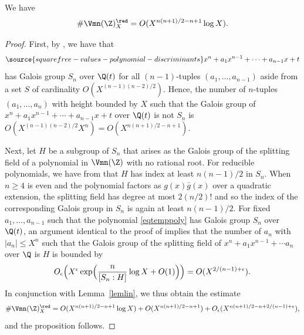 \begin{proposition}
\notready\label{propredboundall}
We have
  \begin{equation*}
\#\Vmn(\Z)^\red_X=O(X^{n(n+1)/2-n+1}\log X).
  \end{equation*}
\end{proposition}
\begin{proof}
  First, by \cite[Lemma~2]{Dietmann}, we have that
\begin{equation}\label{eqtemppoly}
\source{squarefree-values-polynomial-discriminants}
  x^n+a_1x^{n-1}+\cdots +a_{n-1}x+t
\end{equation}
has Galois group $S_n$ over $\Q(t)$ for all $(n-1)$-tuples
$(a_1,\ldots,a_{n-1})$ aside from a set $S$ of cardinality
$O(X^{(n-1)(n-2)/2})$. Hence, the number of $n$-tuples
$(a_1,\ldots,a_n)$ with height bounded by $X$ such that the Galois
group of $x^n+a_1x^{n-1}+\cdots +a_{n-1}x+t$ over $\Q(t)$ is not $S_n$
is $O(X^{(n-1)(n-2)/2}X^n) = O(X^{n(n+1)/2-n+1})$.

Next, let $H$ be a subgroup of $S_n$ that arises as the Galois group
of the splitting field of a polynomial in $\Vmn(\Z)$ with no rational
root. For reducible polynomials, we have from \cite[Lemma~4]{Dietmann} that
$H$ has index at least $n(n-1)/2$ in $S_n$. When $n\geq4$ is even and
the polynomial factors as $g(x)\bar{g}(x)$ over a quadratic extension,
the splitting field has degree at most $2(n/2)!$ and so the index of
the corresponding Galois group in $S_n$ is again at least $n(n-1)/2$.
For fixed $a_1,\ldots,a_{n-1}$ such that the polynomial
\eqref{eqtemppoly} has Galois group $S_n$ over $\Q(t)$, an argument
identical to the proof of \cite[Theorem~1]{Dietmann} implies that the
number of $a_n$ with $|a_n|\leq X^n$ such that the Galois group of the
splitting field of $x^n+a_1x^{n-1}+\cdots a_n$ over $\Q$ is $H$ is
bounded by
$$
O_\epsilon\Bigl(X^\epsilon\exp\Bigl(\frac{n}{[S_n:H]}\log X +O(1)\Bigr)\Bigr)
=O(X^{2/(n-1)+\epsilon}).
$$
In conjunction with Lemma~\ref{lemlin}, we thus obtain the estimate
  \begin{equation*}
    \#\Vmn(\Z)^\red_X=O(X^{n(n+1)/2-n+1}\log X)+O(X^{n(n+1)/2-n+1})+
    O_\epsilon(X^{n(n+1)/2-n+2/(n-1)+\epsilon}),
  \end{equation*}
and the proposition follows.
\end{proof}




